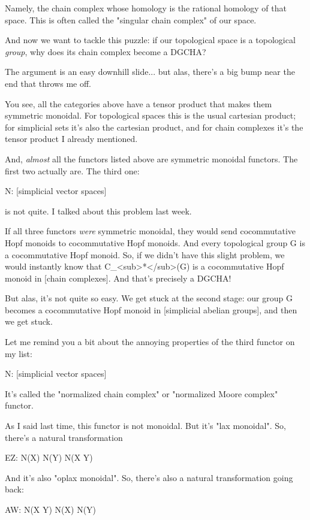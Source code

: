 Namely, the chain complex whose homology is the rational homology 
of that space.   This is often called the "singular chain complex"
of our space.

And now we want to tackle this puzzle: if our topological space is a
topological \emph{group}, why does its chain complex become a DGCHA?

The argument is an easy downhill slide... but alas, there's a big bump
near the end that throws me off.

You see, all the categories above have a tensor product that makes
them symmetric monoidal.  For topological spaces this is the usual
cartesian product; for simplicial sets it's also the cartesian
product, and for chain complexes it's the tensor product I already
mentioned.

And, \emph{almost} all the functors listed above are symmetric monoidal
functors.  The first two actually are.  The third one:

N: [simplicial vector spaces] 

is not quite.  I talked about this problem last week.  

If all three functors \emph{were} symmetric monoidal, they would
send cocommutative Hopf monoids to cocommutative Hopf monoids.  And
every topological group G is a cocommutative Hopf monoid.  So, if we
didn't have this slight problem, we would instantly know that
C_{<sub>*}</sub>(G) is a cocommutative Hopf monoid in [chain
complexes].  And that's precisely a DGCHA!

But alas, it's not quite so easy.  We get stuck at the second stage:
our group G becomes a cocommutative Hopf monoid in [simplicial
abelian groups], and then we get stuck.  

Let me remind you a bit about the annoying properties of the third
functor on my list:

N: [simplicial vector spaces] 

It's called the "normalized chain complex" or
"normalized Moore complex" functor.

As I said last time, this functor is not monoidal.  But it's "lax
monoidal".  So, there's a natural transformation

EZ: N(X) \otimes  N(Y) \to  N(X \times  Y)

And it's also "oplax monoidal".  So, there's also a
natural transformation going back:

AW: N(X \times  Y) \to  N(X) \otimes  N(Y)

